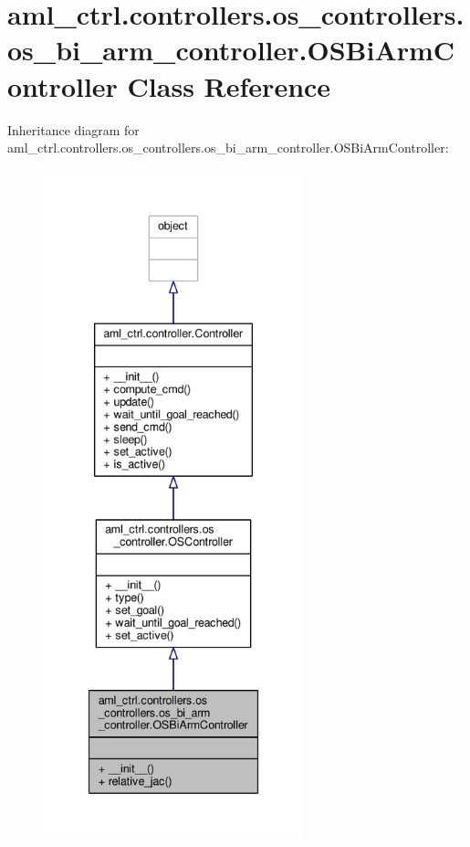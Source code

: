\hypertarget{classaml__ctrl_1_1controllers_1_1os__controllers_1_1os__bi__arm__controller_1_1_o_s_bi_arm_controller}{\section{aml\-\_\-ctrl.\-controllers.\-os\-\_\-controllers.\-os\-\_\-bi\-\_\-arm\-\_\-controller.\-O\-S\-Bi\-Arm\-Controller Class Reference}
\label{classaml__ctrl_1_1controllers_1_1os__controllers_1_1os__bi__arm__controller_1_1_o_s_bi_arm_controller}
}


Inheritance diagram for aml\-\_\-ctrl.\-controllers.\-os\-\_\-controllers.\-os\-\_\-bi\-\_\-arm\-\_\-controller.\-O\-S\-Bi\-Arm\-Controller\-:
\nopagebreak
\begin{figure}[H]
\begin{center}
\leavevmode
\includegraphics[height=550pt]{classaml__ctrl_1_1controllers_1_1os__controllers_1_1os__bi__arm__controller_1_1_o_s_bi_arm_controller__inherit__graph}
\end{center}
\end{figure}


